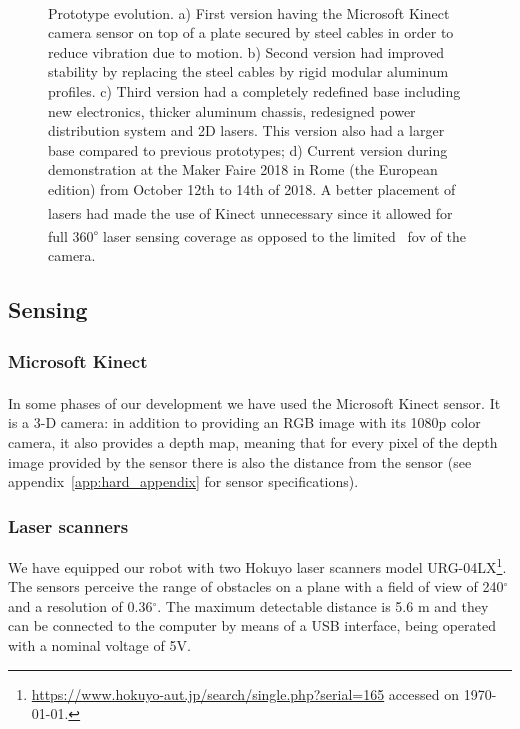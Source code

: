 \begin{figure}[ht]
      \caption{Prototype evolution. a) First version having the Microsoft Kinect\textsuperscript{\textregistered} camera sensor on top of a plate secured by steel cables in order to reduce vibration due to motion. b) Second version had improved stability by replacing the steel cables by rigid modular aluminum profiles. c) Third version had a completely redefined base including new electronics, thicker aluminum chassis, redesigned power distribution system and 2D lasers. This version also had a larger base compared to previous prototypes; d) Current version during demonstration at the Maker Faire 2018 in Rome (the European edition) from October 12th to 14th of 2018. A better placement of lasers had made the use of Kinect\textsuperscript{\textregistered} unnecessary since it allowed for full 360\textsuperscript{$\circ$} laser sensing coverage as opposed to the limited ~\gls{fov} of the camera.}
      \label{fig:evolution}
\end{figure}

\subsection{Sensing}
\subsubsection{Microsoft Kinect\textsuperscript{\textregistered}\label{sec:kinectsec}}
In some phases of our development we have used the Microsoft Kinect\textsuperscript{\textregistered} sensor. It is a 3-D camera: in addition to providing an RGB image with its 1080p color camera, it also provides a depth map, meaning that for every pixel of the depth image provided by the sensor there is also the distance from the sensor (see appendix~\ref{app:hard_appendix} for sensor specifications). 

\subsubsection{Laser scanners}\label{sec:lasers_hokuyo}
We have equipped our robot with two Hokuyo laser scanners model URG-04LX\footnote{\url{https://www.hokuyo-aut.jp/search/single.php?serial=165} accessed on \today.}. The sensors perceive the range of obstacles on a plane with a field of view of 240$^\circ$ and a resolution of 0.36$^\circ$. The maximum detectable distance is 5.6 m and they can be connected to the computer by means of a USB interface, being operated with a nominal voltage of 5V.

